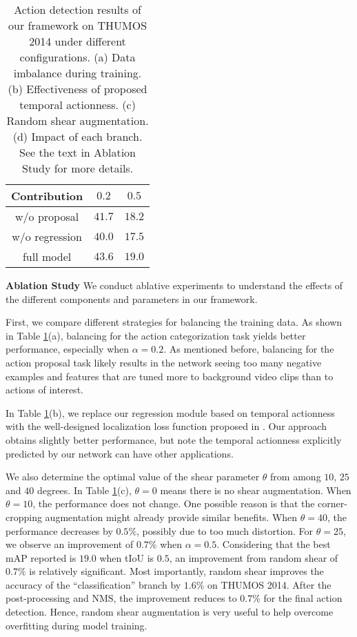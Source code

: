 \documentclass[10pt,twocolumn,letterpaper]{article}
\begin{document}
\begin{table}[t]
\begin{minipage}{0.24\textwidth}
{{\begin{tabular}{ | c | c | c |}
					\hline
					Contribution							&  $0.2$ 	&	$0.5$ 	\\
					\hline		
					w/o proposal						  	& $41.7$	&  $18.2$		\\	
					w/o regression 			  & $40.0$	 &  $17.5$		\\	
					full model						  	& $43.6$	&  $19.0$		\\	
					\hline
				\end{tabular}
			}
		}
	\end{minipage}%
	\caption{Action detection results of our framework on THUMOS 2014 under different configurations. (a) Data imbalance during training. (b) Effectiveness of proposed temporal actionness. (c) Random shear augmentation. (d) Impact of each branch. See the text in Ablation Study for more details. \label{tab:Ablation}}%
	\vspace{-2ex}
\end{table} 

\noindent \textbf{Ablation Study} 
We conduct ablative experiments to understand the effects of the different components and parameters in our framework.

First, we compare different strategies for balancing the training data. As shown in Table \ref{tab:Ablation}(a), balancing for the action categorization task yields better performance, especially when $\alpha=0.2$. As mentioned before, balancing for the action proposal task likely results in the network seeing too many negative examples and features that are tuned more to background video clips than to actions of interest. 

In Table \ref{tab:Ablation}(b), we replace our regression module based on temporal actionness with the well-designed localization loss function proposed in \cite{scnn_shou_wang_chang_cvpr16}. Our approach obtains slightly better performance, but note the temporal actionness explicitly predicted by our network can have other applications.

We also determine the optimal value of the shear parameter $\theta$ from among $10$, $25$ and $40$ degrees. In Table \ref{tab:Ablation}(c), $\theta=0$ means there is no shear augmentation. When $\theta=10$, the performance does not change. One possible reason is that the corner-cropping augmentation might already provide similar benefits. When $\theta=40$, the performance decreases by $0.5\%$, possibly due to too much distortion. For $\theta=25$, we observe an improvement of $0.7\%$ when $\alpha=0.5$. Considering that the best mAP reported is $19.0$ when tIoU is $0.5$, an improvement from random shear of $0.7\%$ is relatively significant. Most importantly, random shear improves the accuracy of the ``classification'' branch by $1.6\%$ on THUMOS 2014. After the post-processing and NMS, the improvement reduces to $0.7\%$ for the final action detection. Hence, random shear augmentation is very useful to help overcome overfitting during model training. 
\end{document}
